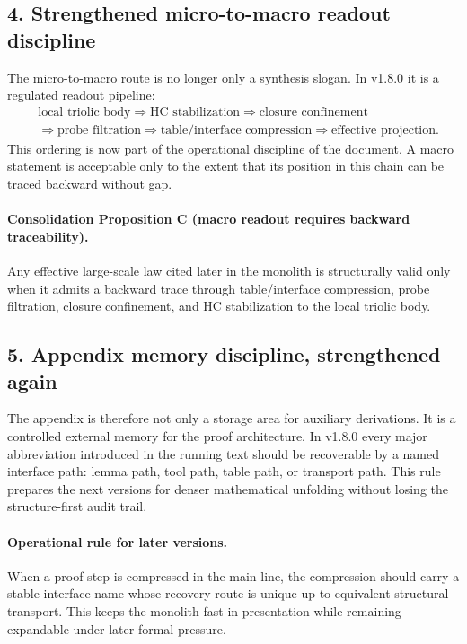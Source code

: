 \subsection*{4. Strengthened micro-to-macro readout discipline}
The micro-to-macro route is no longer only a synthesis slogan. In v1.8.0 it is
a regulated readout pipeline:
\[
\begin{aligned}
&\text{local triolic body} \Longrightarrow \text{HC stabilization} \Longrightarrow \text{closure confinement}\\
&\Longrightarrow \text{probe filtration} \Longrightarrow \text{table/interface compression} \Longrightarrow \text{effective projection}.
\end{aligned}
\]
This ordering is now part of the operational discipline of the document. A macro
statement is acceptable only to the extent that its position in this chain can be
traced backward without gap.

\paragraph{Consolidation Proposition C (macro readout requires backward traceability).}
Any effective large-scale law cited later in the monolith is structurally valid only
when it admits a backward trace through table/interface compression, probe
filtration, closure confinement, and HC stabilization to the local triolic body.

\subsection*{5. Appendix memory discipline, strengthened again}
The appendix is therefore not only a storage area for auxiliary derivations. It is
a controlled external memory for the proof architecture. In v1.8.0 every major
abbreviation introduced in the running text should be recoverable by a named
interface path: lemma path, tool path, table path, or transport path. This rule
prepares the next versions for denser mathematical unfolding without losing the
structure-first audit trail.

\paragraph{Operational rule for later versions.}
When a proof step is compressed in the main line, the compression should carry a
stable interface name whose recovery route is unique up to equivalent structural
transport. This keeps the monolith fast in presentation while remaining expandable
under later formal pressure.

